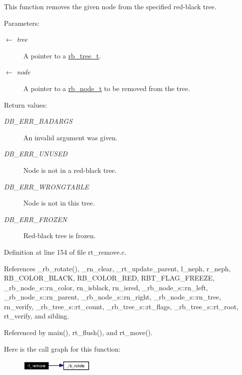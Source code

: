 This function removes the given node from the specified red-black tree.

\begin{Desc}
\item[Parameters:]
\begin{description}
\item[\mbox{$\leftarrow$} {\em tree}]A pointer to a \hyperlink{group__dbprim__rbtree_ga0}{rb\_\-tree\_\-t}. \item[\mbox{$\leftarrow$} {\em node}]A pointer to a \hyperlink{group__dbprim__rbtree_ga1}{rb\_\-node\_\-t} to be removed from the tree.\end{description}
\end{Desc}
\begin{Desc}
\item[Return values:]
\begin{description}
\item[{\em DB\_\-ERR\_\-BADARGS}]An invalid argument was given. \item[{\em DB\_\-ERR\_\-UNUSED}]Node is not in a red-black tree. \item[{\em DB\_\-ERR\_\-WRONGTABLE}]Node is not in this tree. \item[{\em DB\_\-ERR\_\-FROZEN}]Red-black tree is frozen.\end{description}
\end{Desc}


Definition at line 154 of file rt\_\-remove.c.

References \_\-rb\_\-rotate(), \_\-rn\_\-clear, \_\-rt\_\-update\_\-parent, l\_\-neph, r\_\-neph, RB\_\-COLOR\_\-BLACK, RB\_\-COLOR\_\-RED, RBT\_\-FLAG\_\-FREEZE, \_\-rb\_\-node\_\-s::rn\_\-color, rn\_\-isblack, rn\_\-isred, \_\-rb\_\-node\_\-s::rn\_\-left, \_\-rb\_\-node\_\-s::rn\_\-parent, \_\-rb\_\-node\_\-s::rn\_\-right, \_\-rb\_\-node\_\-s::rn\_\-tree, rn\_\-verify, \_\-rb\_\-tree\_\-s::rt\_\-count, \_\-rb\_\-tree\_\-s::rt\_\-flags, \_\-rb\_\-tree\_\-s::rt\_\-root, rt\_\-verify, and sibling.

Referenced by main(), rt\_\-flush(), and rt\_\-move().

Here is the call graph for this function:\begin{figure}[H]
\begin{center}
\leavevmode
\includegraphics[width=103pt]{group__dbprim__rbtree_ga8_cgraph}
\end{center}
\end{figure}
